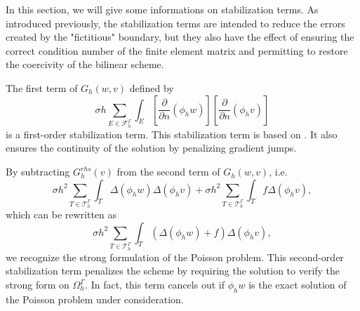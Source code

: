 In this section, we will give some informations on stabilization terms. As introduced previously, the stabilization terms are intended to reduce the errors created by the "fictitious" boundary, but they also have the effect of ensuring the correct condition number of the finite element matrix and permitting to restore the coercivity of the bilinear scheme.                                                                                      

The first term of $G_h(w,v)$ defined by
\begin{equation*}
	\sigma h\sum_{E\in\mathcal{F}_h^\Gamma} \int_E \left[\frac{\partial}{\partial n}(\phi_h w)\right] \left[\frac{\partial}{\partial n}(\phi_h v)\right]
\end{equation*}
is a first-order stabilization term. This stabilization term is based on \cite{burman_ghost_2010}. It also ensures the continuity of the solution by penalizing gradient jumps.

By subtracting $G_h^{rhs}(v)$ from the second term of $G_h(w,v)$, i.e.
\begin{equation*}
	\sigma h^2\sum_{T\in\mathcal{T}_h^\Gamma} \int_{T} \Delta(\phi_h w)\Delta(\phi_h v)+\sigma h^2\sum_{T\in\mathcal{T}_h^\Gamma} \int_{T} f \Delta(\phi_h v),
\end{equation*}
which can be rewritten as
\begin{equation*}
	\sigma h^2\sum_{T\in\mathcal{T}_h^\Gamma} \int_{T} \left(\Delta(\phi_h w)+f\right)\Delta(\phi_h v),
\end{equation*}
we recognize the strong formulation of the Poisson problem. This second-order stabilization term penalizes the scheme by requiring the solution to verify the strong form on $\Omega_h^\Gamma$. In fact, this term cancels out if $\phi_h w$ is the exact solution of the Poisson problem under consideration.
